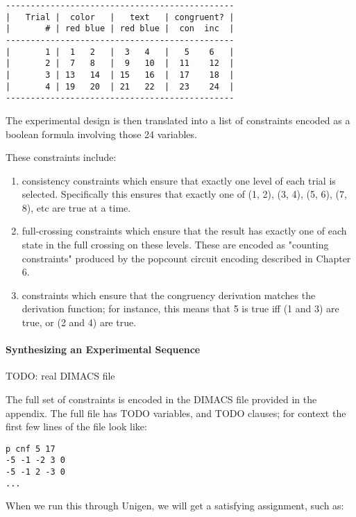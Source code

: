 \begin{verbatim}
----------------------------------------------
|   Trial |  color   |   text   | congruent? |
|       # | red blue | red blue |  con  inc  |
----------------------------------------------
|       1 |  1   2   |  3   4   |   5    6   |
|       2 |  7   8   |  9   10  |  11    12  |
|       3 | 13   14  | 15   16  |  17    18  |
|       4 | 19   20  | 21   22  |  23    24  |
----------------------------------------------
\end{verbatim}

The experimental design is then translated into a list of constraints encoded as a boolean formula involving those 24 variables.

These constraints include:
\begin{enumerate}

\item consistency constraints which ensure that exactly one level of each trial is selected. Specifically this ensures that exactly one of (1, 2), (3, 4), (5, 6), (7, 8), etc are true at a time.

\item full-crossing constraints which ensure that the result has exactly one of each state in the full crossing on these levels. These are encoded as "counting constraints" produced by the popcount circuit encoding described in Chapter 6.

\item constraints which ensure that the congruency derivation matches the derivation function; for instance, this means that 5 is true iff (1 and 3) are true, or (2 and 4) are true.

\end{enumerate}

\paragraph*{Synthesizing an Experimental Sequence}

TODO: real DIMACS file

The full set of constraints is encoded in the DIMACS file provided in the appendix. The full file has TODO variables, and TODO clauses; for context the first few lines of the file look like:

\begin{verbatim}
p cnf 5 17
-5 -1 -2 3 0
-5 -1 2 -3 0
...
\end{verbatim}

When we run this through Unigen, we will get a satisfying assignment, such as:

